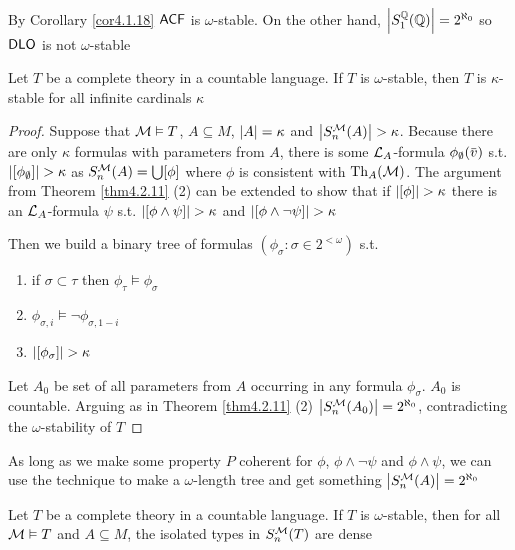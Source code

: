 \documentclass[11pt]{article}
\begin{document}
By Corollary \ref{cor4.1.18} \(\textsf{ACF}\) is \(\omega\)-stable. On the other hand, \(\abs{S_1^{\Q}(\Q)}=2^{\aleph_0}\)
so \(\operatorname{\textsf{DLO}}\) is not \(\omega\)-stable

\begin{theorem}[]
\label{thm4.2.18}
Let \(T\) be a complete theory in a countable language. If \(T\) is \(\omega\)-stable, then \(T\) is
\(\kappa\)-stable for all infinite cardinals \(\kappa\)
\end{theorem}

\begin{proof}
Suppose that \(\mathcal{M}\vDash T\), \(A\subseteq M\), \(\abs{A}=\kappa\) and \(\abs{S_n^{\calm}(A)}>\kappa\). Because there are
only \(\kappa\) formulas with parameters from \(A\), there is some \(\mathcal{L}_A\)-formula \(\phi_\emptyset(\barv)\)
s.t. \(\abs{[\phi_\emptyset]}>\kappa\) as \(S_n^{\mathcal{M}}(A)=\bigcup[\phi]\) where \(\phi\) is consistent with \(\operatorname{Th}_A(\mathcal{M})\). The
argument from Theorem \ref{thm4.2.11} (2) can be extended to show that if \(\abs{[\phi]}>\kappa\) there is
an \(\mathcal{L}_A\)-formula \(\psi\) s.t. \(\abs{[\phi\wedge\psi]}>\kappa\) and \(\abs{[\phi\wedge\neg\psi]}>\kappa\)

Then we build a binary tree of formulas \((\phi_\sigma:\sigma\in 2^{<\omega})\) s.t.
\begin{enumerate}
\item if \(\sigma\subset\tau\) then \(\phi_\tau\vDash\phi_\sigma\)
\item \(\phi_{\sigma,i}\vDash\neg\phi_{\sigma,1-i}\)
\item \(\abs{[\phi_\sigma]}>\kappa\)
\end{enumerate}


Let \(A_0\) be set of all parameters from \(A\) occurring in any formula \(\phi_\sigma\).  \(A_0\) is
countable. Arguing as in Theorem \ref{thm4.2.11} (2) \(\abs{S_n^{\calm}(A_0)}=2^{\aleph_0}\), contradicting
the \(\omega\)-stability of \(T\)
\end{proof}

\begin{remark}
As long as we make some property \(P\) coherent for \(\phi\), \(\phi\wedge\neg\psi\) and \(\phi\wedge\psi\), we can use the
technique to make a \(\omega\)-length tree and get something \(\abs{S_n^{\calm}(A)}=2^{\aleph_0}\)
\end{remark}

\begin{proposition}[]
\label{prop4.2.19}
Let \(T\) be a complete theory in a countable language. If \(T\) is \(\omega\)-stable, then for
all \(\mathcal{M}\vDash T\) and \(A\subseteq M\), the isolated types in \(S_n^{\mathcal{M}}(T)\) are dense
\end{proposition}
\end{document}

